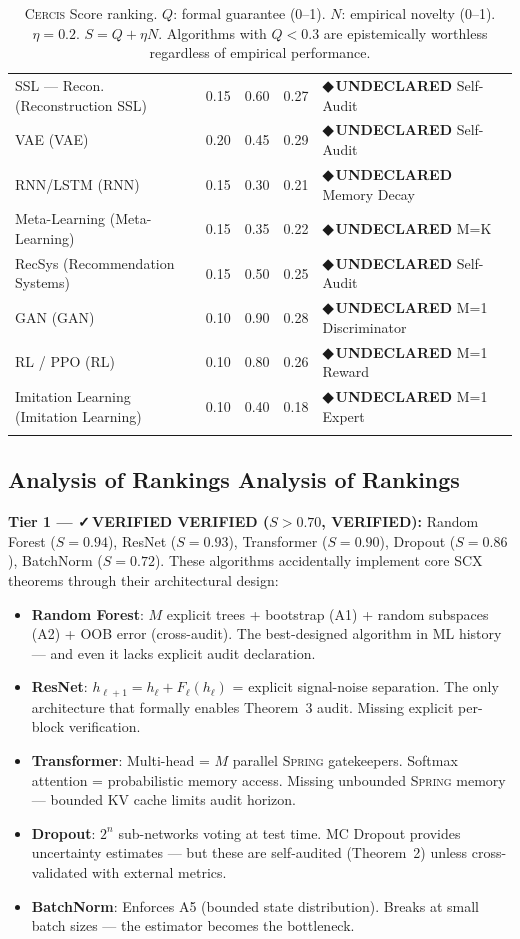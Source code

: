 \documentclass[12pt,a4paper]{article}
\theoremstyle{definition}
\newcommand{\guilty}{{\color{guiltycolor}\textbf{◆\,UNDECLARED}}}
\newcommand{\verified}{{\color{verifiedcolor}\textbf{✓\,VERIFIED}}}
\newcommand{\Spring}{\textsc{Spring}}
\newcommand{\Cercis}{\textsc{Cercis}}
\newcommand{\SCX}{\textsc{SCX}}
\begin{document}
\begin{longtable}{p{3.8cm} c c c p{2.5cm}}
SSL — Recon. (Reconstruction SSL) & 0.15 & 0.60 & 0.27 & \guilty{} Self-Audit \\
VAE (VAE) & 0.20 & 0.45 & 0.29 & \guilty{} Self-Audit \\
RNN/LSTM (RNN) & 0.15 & 0.30 & 0.21 & \guilty{} Memory Decay \\
Meta-Learning (Meta-Learning) & 0.15 & 0.35 & 0.22 & \guilty{} M=K \\
RecSys (Recommendation Systems) & 0.15 & 0.50 & 0.25 & \guilty{} Self-Audit \\
GAN (GAN) & 0.10 & 0.90 & 0.28 & \guilty{} M=1 Discriminator \\
RL / PPO (RL) & 0.10 & 0.80 & 0.26 & \guilty{} M=1 Reward \\
Imitation Learning (Imitation Learning) & 0.10 & 0.40 & 0.18 & \guilty{} M=1 Expert \\
\bottomrule
\caption{\Cercis{} Score ranking. $Q$: formal guarantee (0--1). $N$: empirical novelty (0--1). $\eta=0.2$. $S=Q+\eta N$. Algorithms with $Q<0.3$ are epistemically worthless regardless of empirical performance. }
\label{tab:cercis_ranking}
\end{longtable}

\subsection{Analysis of Rankings Analysis of Rankings}

\noindent\textbf{Tier 1 — \verified{} VERIFIED ($S > 0.70$, VERIFIED):} Random Forest ($S=0.94$), ResNet ($S=0.93$), Transformer ($S=0.90$), Dropout ($S=0.86$), BatchNorm ($S=0.72$). These algorithms accidentally implement core \SCX{} theorems through their architectural design:
\begin{itemize}[nosep]
    \item \textbf{Random Forest}: $M$ explicit trees + bootstrap (A1) + random subspaces (A2) + OOB error (cross-audit). The best-designed algorithm in ML history — and even it lacks explicit audit declaration.
    \item \textbf{ResNet}: $h_{\ell+1} = h_\ell + F_\ell(h_\ell)$ = explicit signal-noise separation. The only architecture that formally enables Theorem~3 audit. Missing explicit per-block verification.
    \item \textbf{Transformer}: Multi-head = $M$ parallel \Spring{} gatekeepers. Softmax attention = probabilistic memory access. Missing unbounded \Spring{} memory — bounded KV cache limits audit horizon.
    \item \textbf{Dropout}: $2^n$ sub-networks voting at test time. MC Dropout provides uncertainty estimates — but these are self-audited (Theorem~2) unless cross-validated with external metrics.
    \item \textbf{BatchNorm}: Enforces A5 (bounded state distribution). Breaks at small batch sizes — the estimator becomes the bottleneck.
\end{itemize}
\end{document}
